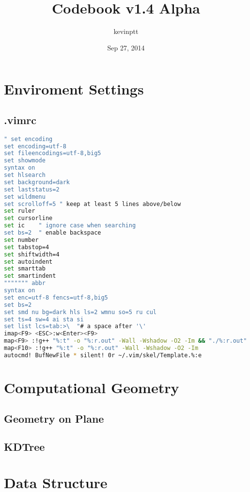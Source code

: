 \documentclass[11pt,twocolumn,a4paper]{article}
\title{Codebook v1.4 Alpha}
\author{kevinptt}
\date{Sep 27, 2014}
\begin{document}
\renewcommand{\contentsname}{Index}
\tableofcontents


\newpage
\section{Enviroment Settings}
\subsection{.vimrc}
\begin{lstlisting}[label=.vimrc,language=bash]
" set encoding
set encoding=utf-8
set fileencodings=utf-8,big5
set showmode
syntax on
set hlsearch
set background=dark
set laststatus=2
set wildmenu
set scrolloff=5 " keep at least 5 lines above/below
set ruler
set cursorline
set ic    " ignore case when searching
set bs=2  " enable backspace
set number
set tabstop=4
set shiftwidth=4
set autoindent
set smarttab
set smartindent
""""""" abbr
syntax on
set enc=utf-8 fencs=utf-8,big5
set bs=2
set smd nu bg=dark hls ls=2 wmnu so=5 ru cul
set ts=4 sw=4 ai sta si
set list lcs=tab:>\  "# a space after '\'
imap<F9> <ESC>:w<Enter><F9>
map<F9> :!g++ "%:t" -o "%:r.out" -Wall -Wshadow -O2 -Im && "./%:r.out"
map<F10> :!g++ "%:t" -o "%:r.out" -Wall -Wshadow -O2 -Im
autocmd! BufNewFile * silent! 0r ~/.vim/skel/Template.%:e
\end{lstlisting}


\newpage
\section{Computational Geometry}

\subsection{Geometry on Plane}


\subsection{KDTree}



\newpage
\section{Data Structure}
\end{document}
